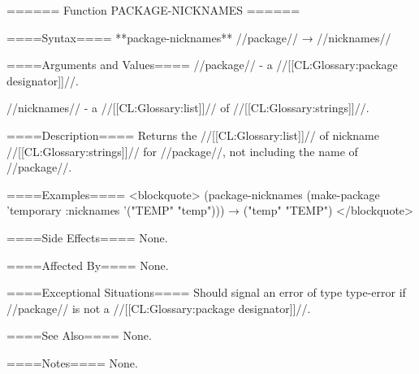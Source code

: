 ====== Function PACKAGE-NICKNAMES ======

====Syntax====
**package-nicknames** //package// → //nicknames//

====Arguments and Values====
//package// - a //[[CL:Glossary:package designator]]//.

//nicknames// - a //[[CL:Glossary:list]]// of //[[CL:Glossary:strings]]//.

====Description====
Returns the //[[CL:Glossary:list]]// of nickname //[[CL:Glossary:strings]]// for //package//, not including the name of //package//.

====Examples====
<blockquote> (package-nicknames (make-package 'temporary :nicknames '("TEMP" "temp"))) → ("temp" "TEMP") </blockquote>

====Side Effects====
None.

====Affected By====
None.

====Exceptional Situations====
Should signal an error of type type-error if //package// is not a //[[CL:Glossary:package designator]]//.

====See Also====
None.

====Notes====
None.

